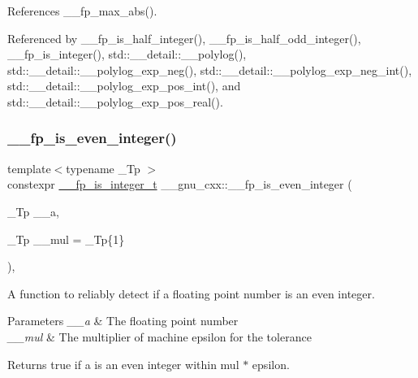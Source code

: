 References \+\_\+\+\_\+fp\+\_\+max\+\_\+abs().



Referenced by \+\_\+\+\_\+fp\+\_\+is\+\_\+half\+\_\+integer(), \+\_\+\+\_\+fp\+\_\+is\+\_\+half\+\_\+odd\+\_\+integer(), \+\_\+\+\_\+fp\+\_\+is\+\_\+integer(), std\+::\+\_\+\+\_\+detail\+::\+\_\+\+\_\+polylog(), std\+::\+\_\+\+\_\+detail\+::\+\_\+\+\_\+polylog\+\_\+exp\+\_\+neg(), std\+::\+\_\+\+\_\+detail\+::\+\_\+\+\_\+polylog\+\_\+exp\+\_\+neg\+\_\+int(), std\+::\+\_\+\+\_\+detail\+::\+\_\+\+\_\+polylog\+\_\+exp\+\_\+pos\+\_\+int(), and std\+::\+\_\+\+\_\+detail\+::\+\_\+\+\_\+polylog\+\_\+exp\+\_\+pos\+\_\+real().

\mbox{\label{namespace____gnu__cxx_ab12d5d801c39cd185e31bf2ed6ce94ff}} 
\subsubsection{\texorpdfstring{\+\_\+\+\_\+fp\+\_\+is\+\_\+even\+\_\+integer()}{\_\_fp\_is\_even\_integer()}}
{\footnotesize\ttfamily template$<$typename \+\_\+\+Tp $>$ \\
constexpr \hyperlink{struct____gnu__cxx_1_1____fp__is__integer__t}{\+\_\+\+\_\+fp\+\_\+is\+\_\+integer\+\_\+t} \+\_\+\+\_\+gnu\+\_\+cxx\+::\+\_\+\+\_\+fp\+\_\+is\+\_\+even\+\_\+integer (\begin{DoxyParamCaption}\item[{\+\_\+\+Tp}]{\+\_\+\+\_\+a,  }\item[{\+\_\+\+Tp}]{\+\_\+\+\_\+mul = {\ttfamily \+\_\+Tp\{1\}} }\end{DoxyParamCaption})\hspace{0.3cm}{\ttfamily [inline]}, {\ttfamily [noexcept]}}

A function to reliably detect if a floating point number is an even integer.


\begin{DoxyParams}{Parameters}
{\em \+\_\+\+\_\+a} & The floating point number \\
\hline
{\em \+\_\+\+\_\+mul} & The multiplier of machine epsilon for the tolerance \\
\hline
\end{DoxyParams}
\begin{DoxyReturn}{Returns}
{\ttfamily true} if a is an even integer within mul $\ast$ epsilon. 
\end{DoxyReturn}


